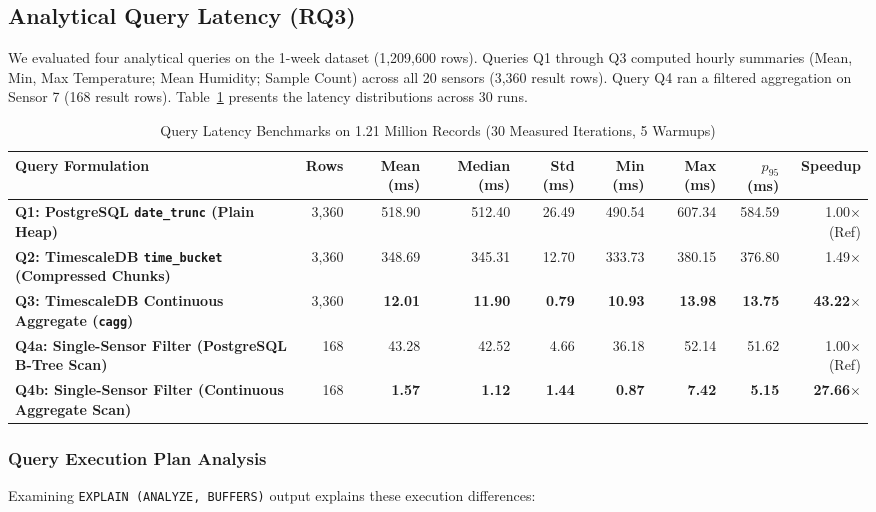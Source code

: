 \documentclass[conference,a4paper]{IEEEtran}
\newcommand{\code}[1]{\texttt{\small #1}}
\begin{document}
\subsection{Analytical Query Latency (RQ3)}
We evaluated four analytical queries on the 1-week dataset (1,209,600 rows). Queries Q1 through Q3 computed hourly summaries (Mean, Min, Max Temperature; Mean Humidity; Sample Count) across all 20 sensors (3,360 result rows). Query Q4 ran a filtered aggregation on Sensor 7 (168 result rows). Table~\ref{tab:query_benchmarks} presents the latency distributions across 30 runs.

\begin{table}[t]
\caption{Query Latency Benchmarks on 1.21 Million Records (30 Measured Iterations, 5 Warmups)}
\label{tab:query_benchmarks}
\centering
\footnotesize
\setlength{\tabcolsep}{4.5pt}
\begin{tabular}{@{}lrrrrrrrr@{}}
\toprule
\textbf{Query Formulation} & \textbf{Rows} & \textbf{Mean (ms)} & \textbf{Median (ms)} & \textbf{Std (ms)} & \textbf{Min (ms)} & \textbf{Max (ms)} & \textbf{$p_{95}$ (ms)} & \textbf{Speedup} \\ \midrule
\textbf{Q1: PostgreSQL \code{date\_trunc} (Plain Heap)} & 3,360 & 518.90 & 512.40 & 26.49 & 490.54 & 607.34 & 584.59 & 1.00$\times$ (Ref) \\
\textbf{Q2: TimescaleDB \code{time\_bucket} (Compressed Chunks)} & 3,360 & 348.69 & 345.31 & 12.70 & 333.73 & 380.15 & 376.80 & 1.49$\times$ \\
\textbf{Q3: TimescaleDB Continuous Aggregate (\code{cagg})} & 3,360 & \textbf{12.01} & \textbf{11.90} & \textbf{0.79} & \textbf{10.93} & \textbf{13.98} & \textbf{13.75} & \textbf{43.22$\times$} \\ \midrule
\textbf{Q4a: Single-Sensor Filter (PostgreSQL B-Tree Scan)} & 168 & 43.28 & 42.52 & 4.66 & 36.18 & 52.14 & 51.62 & 1.00$\times$ (Ref) \\
\textbf{Q4b: Single-Sensor Filter (Continuous Aggregate Scan)} & 168 & \textbf{1.57} & \textbf{1.12} & \textbf{1.44} & \textbf{0.87} & \textbf{7.42} & \textbf{5.15} & \textbf{27.66$\times$} \\ \bottomrule
\end{tabular}
\end{table}

\subsubsection{Query Execution Plan Analysis}
Examining \code{EXPLAIN (ANALYZE, BUFFERS)} output explains these execution differences:
\end{document}

